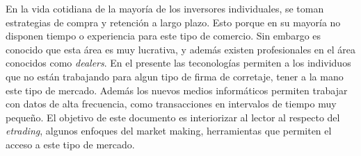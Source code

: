 En la vida cotidiana de la mayoría de los inversores individuales, se toman estrategias de compra y retención a largo plazo. Esto porque en su mayoría
no disponen tiempo o experiencia para este tipo de comercio. Sin embargo es conocido que esta área es muy lucrativa, y además existen profesionales en el área
conocidos como \emph{dealers}. En el presente las teconologías permiten a los individuos que no están trabajando para algun tipo de firma de corretaje, tener a la
mano este tipo de mercado. Además los nuevos medios informáticos permiten trabajar con datos de alta frecuencia, como transacciones en intervalos de tiempo muy pequeño.
El objetivo de este documento es interiorizar al lector al respecto del \emph{etrading}, algunos enfoques del market making, herramientas que permiten el acceso a 
este tipo de mercado.
